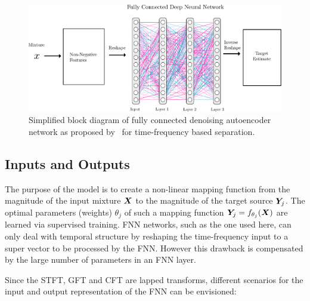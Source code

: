 \begin{figure}[ht!]
\centering
		\includegraphics[width=\textwidth]{Chapters/06_Separation_Unknown/figures/uhlich_dnn.pdf}
\caption{Simplified block diagram of fully connected denoising autoencoder network as proposed by~\cite{uhlich15} for time-frequency based separation.}
\label{fig:cft_dnn}
\end{figure}

\subsection{Inputs and Outputs}

The purpose of the model is to create a non-linear mapping function from the magnitude of the input mixture \({\bm{X}}\) to the magnitude of the target source \({\bm{Y}}_j\).
The optimal parameters (weights) \(\theta_j\) of such a mapping function \({\bm{Y}}_j = f_{\theta_j}({\bm{X}})\) are learned via supervised training.
FNN networks, such as the one used here, can only deal with temporal structure by reshaping the time-frequency input to a super vector to be processed by the FNN. 
However this drawback is compensated by the large number of parameters in an FNN layer.

Since the STFT, GFT and CFT are lapped transforms, different scenarios for the input and output representation of the FNN can be envisioned:


